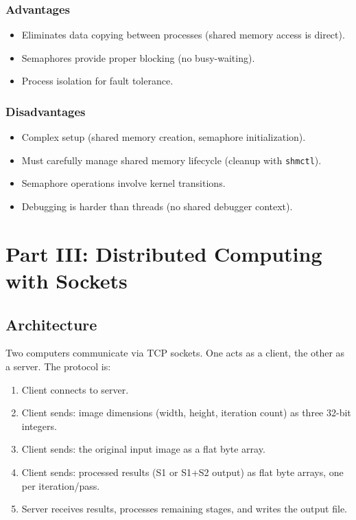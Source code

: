 \documentclass[12pt,a4paper]{article}
\begin{document}
\subsubsection{Advantages}
\begin{itemize}
    \item Eliminates data copying between processes (shared memory access is direct).
    \item Semaphores provide proper blocking (no busy-waiting).
    \item Process isolation for fault tolerance.
\end{itemize}

\subsubsection{Disadvantages}
\begin{itemize}
    \item Complex setup (shared memory creation, semaphore initialization).
    \item Must carefully manage shared memory lifecycle (cleanup with \texttt{shmctl}).
    \item Semaphore operations involve kernel transitions.
    \item Debugging is harder than threads (no shared debugger context).
\end{itemize}

\section{Part III: Distributed Computing with Sockets}

\subsection{Architecture}
Two computers communicate via TCP sockets. One acts as a client, the other as a server. The protocol is:
\begin{enumerate}
    \item Client connects to server.
    \item Client sends: image dimensions (width, height, iteration count) as three 32-bit integers.
    \item Client sends: the original input image as a flat byte array.
    \item Client sends: processed results (S1 or S1+S2 output) as flat byte arrays, one per iteration/pass.
    \item Server receives results, processes remaining stages, and writes the output file.
\end{enumerate}
\end{document}
